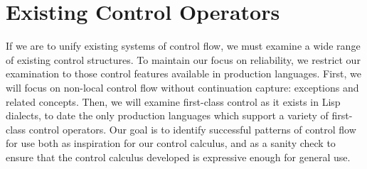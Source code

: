 \documentclass[11pt]{article}
\newcommand{\maybePage}{\newpage}
\begin{document}
%
%
%
%
%
%
%

\maybePage
\part{Existing Control Operators}

If we are to unify existing systems of control flow, we must examine a wide range of existing control structures. To maintain our focus on reliability, we restrict our examination to those control features available in production languages. First, we will focus on non-local control flow without continuation capture: exceptions and related concepts. Then, we will examine first-class control as it exists in Lisp dialects, to date the only production languages which support a variety of first-class control operators. Our goal is to identify successful patterns of control flow for use both as inspiration for our control calculus, and as a sanity check to ensure that the control calculus developed is expressive enough for general use.
\end{document}
